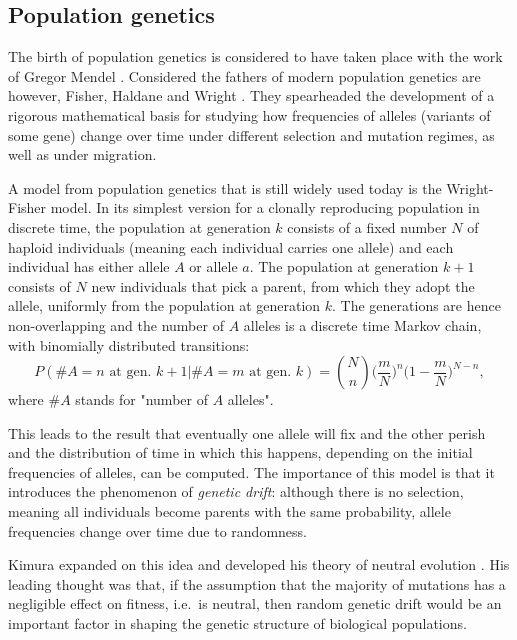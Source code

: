 \documentclass[11pt, a4paper]{article}
\theoremstyle{definition}
\begin{document}
\subsection{Population genetics}
    The birth of population genetics is considered to have taken place with the work of Gregor Mendel \autocite{mendel1865}. Considered the fathers of modern population genetics are however, Fisher, Haldane and Wright \autocite{fisher1918,haldane1924a,haldane1924b,wright1931}. They spearheaded the development of a rigorous mathematical basis for studying how frequencies of alleles (variants of some gene) change over time under different selection and mutation regimes, as well as under migration.

    A model from population genetics that is still widely used today is the Wright-Fisher model. In its simplest version for a clonally reproducing population in discrete time, the population at generation $k$ consists of a fixed number $N$ of haploid individuals (meaning each individual carries one allele) and each individual has either allele $A$ or allele $a$. The population at generation $k+1$ consists of $N$ new individuals that pick a parent, from which they adopt the allele, uniformly
    from the population at generation $k$. The generations are hence non-overlapping and the number of $A$ alleles is a discrete time Markov chain, with binomially distributed transitions:
    \begin{equation}
        P(\# A = n\text{ at gen. }k+1 | \# A = m\text{ at gen. }k) = {N\choose n} \Big(\frac{m}{N} \Big)^n \Big(1-\frac{m}{N} \Big)^{N-n},
    \end{equation}
    where $\#A$ stands for "number of $A$ alleles".

    This leads to the result that eventually one allele will fix and the other perish and the distribution of time in which this happens, depending on the initial frequencies of alleles, can be computed.  
    The importance of this model is that it introduces the phenomenon of \emph{genetic drift}: although there is no selection, meaning all individuals become parents with the same probability, allele frequencies change over time due to randomness.

    Kimura expanded on this idea and developed his theory of neutral evolution \autocite{kimura1983}. His leading thought was that, if the assumption that the majority of mutations has a negligible effect on fitness, i.e.\ is neutral, then random genetic drift would be an important factor in shaping the genetic structure of biological populations.
\end{document}
